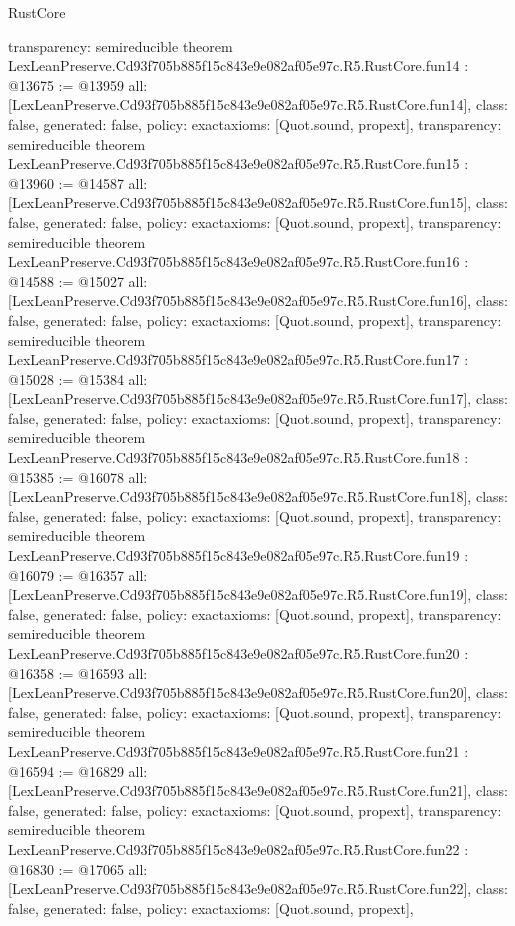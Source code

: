 \begin{lexlean}{RustCore}
\begin{coremodule}
{  transparency: semireducible
}
theorem LexLeanPreserve.Cd93f705b885f15c843e9e082af05e97c.R5.RustCore.fun14 : @13675 := @13959 {
  all: [LexLeanPreserve.Cd93f705b885f15c843e9e082af05e97c.R5.RustCore.fun14],
  class: false,
  generated: false,
  policy: exact{axioms: [Quot.sound, propext]},
  transparency: semireducible
}
theorem LexLeanPreserve.Cd93f705b885f15c843e9e082af05e97c.R5.RustCore.fun15 : @13960 := @14587 {
  all: [LexLeanPreserve.Cd93f705b885f15c843e9e082af05e97c.R5.RustCore.fun15],
  class: false,
  generated: false,
  policy: exact{axioms: [Quot.sound, propext]},
  transparency: semireducible
}
theorem LexLeanPreserve.Cd93f705b885f15c843e9e082af05e97c.R5.RustCore.fun16 : @14588 := @15027 {
  all: [LexLeanPreserve.Cd93f705b885f15c843e9e082af05e97c.R5.RustCore.fun16],
  class: false,
  generated: false,
  policy: exact{axioms: [Quot.sound, propext]},
  transparency: semireducible
}
theorem LexLeanPreserve.Cd93f705b885f15c843e9e082af05e97c.R5.RustCore.fun17 : @15028 := @15384 {
  all: [LexLeanPreserve.Cd93f705b885f15c843e9e082af05e97c.R5.RustCore.fun17],
  class: false,
  generated: false,
  policy: exact{axioms: [Quot.sound, propext]},
  transparency: semireducible
}
theorem LexLeanPreserve.Cd93f705b885f15c843e9e082af05e97c.R5.RustCore.fun18 : @15385 := @16078 {
  all: [LexLeanPreserve.Cd93f705b885f15c843e9e082af05e97c.R5.RustCore.fun18],
  class: false,
  generated: false,
  policy: exact{axioms: [Quot.sound, propext]},
  transparency: semireducible
}
theorem LexLeanPreserve.Cd93f705b885f15c843e9e082af05e97c.R5.RustCore.fun19 : @16079 := @16357 {
  all: [LexLeanPreserve.Cd93f705b885f15c843e9e082af05e97c.R5.RustCore.fun19],
  class: false,
  generated: false,
  policy: exact{axioms: [Quot.sound, propext]},
  transparency: semireducible
}
theorem LexLeanPreserve.Cd93f705b885f15c843e9e082af05e97c.R5.RustCore.fun20 : @16358 := @16593 {
  all: [LexLeanPreserve.Cd93f705b885f15c843e9e082af05e97c.R5.RustCore.fun20],
  class: false,
  generated: false,
  policy: exact{axioms: [Quot.sound, propext]},
  transparency: semireducible
}
theorem LexLeanPreserve.Cd93f705b885f15c843e9e082af05e97c.R5.RustCore.fun21 : @16594 := @16829 {
  all: [LexLeanPreserve.Cd93f705b885f15c843e9e082af05e97c.R5.RustCore.fun21],
  class: false,
  generated: false,
  policy: exact{axioms: [Quot.sound, propext]},
  transparency: semireducible
}
theorem LexLeanPreserve.Cd93f705b885f15c843e9e082af05e97c.R5.RustCore.fun22 : @16830 := @17065 {
  all: [LexLeanPreserve.Cd93f705b885f15c843e9e082af05e97c.R5.RustCore.fun22],
  class: false,
  generated: false,
  policy: exact{axioms: [Quot.sound, propext]},
}
\end{coremodule}
\end{lexlean}
